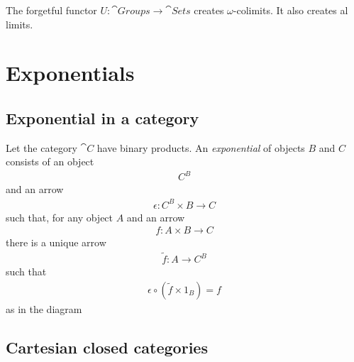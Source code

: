 \documentclass{article}
\begin{document}
\begin{proposition}
    The forgetful functor $U:\cat{Groups}\to\cat{Sets}$ creates $\omega$-colimits.
    It also creates al limits.
\end{proposition}

\section{Exponentials}

\subsection{Exponential in a category}

\begin{definition}[Awodey p. 121]
    Let the category $\cat C$ have binary products. An \emph{exponential}
    of objects $B$ and $C$ consists of an object
    \begin{align*}
        C^B
    \end{align*}
    and an arrow
    \begin{align*}
        \epsilon:C^B\times B \to C
    \end{align*}
    such that, for any object $A$ and an arrow
    \begin{align*}
        f:A\times B\to C
    \end{align*}
    there is a unique arrow
    \begin{align*}
        \tilde f:A\to C^B
    \end{align*}
    such that
    \begin{align*}
        \epsilon \circ (\tilde f\times 1_B) = f
    \end{align*}
    as in the diagram
    \begin{center}
    \end{center}
\end{definition}

\subsection{Cartesian closed categories}
\end{document}
